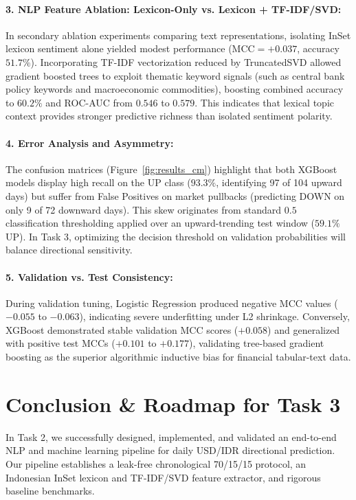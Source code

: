 \documentclass[10pt,a4paper]{article}
\begin{document}
\paragraph{3. NLP Feature Ablation: Lexicon-Only vs. Lexicon + TF-IDF/SVD:}
In secondary ablation experiments comparing text representations, isolating InSet lexicon sentiment alone yielded modest performance ($\text{MCC} = +0.037$, accuracy $51.7\%$). Incorporating TF-IDF vectorization reduced by TruncatedSVD allowed gradient boosted trees to exploit thematic keyword signals (such as central bank policy keywords and macroeconomic commodities), boosting combined accuracy to $60.2\%$ and ROC-AUC from $0.546$ to $0.579$. This indicates that lexical topic context provides stronger predictive richness than isolated sentiment polarity.

\paragraph{4. Error Analysis and Asymmetry:}
The confusion matrices (Figure~\ref{fig:results_cm}) highlight that both XGBoost models display high recall on the UP class ($93.3\%$, identifying 97 of 104 upward days) but suffer from False Positives on market pullbacks (predicting DOWN on only 9 of 72 downward days). This skew originates from standard $0.5$ classification thresholding applied over an upward-trending test window ($59.1\%$ UP). In Task 3, optimizing the decision threshold on validation probabilities will balance directional sensitivity.

\paragraph{5. Validation vs. Test Consistency:}
During validation tuning, Logistic Regression produced negative MCC values ($-0.055$ to $-0.063$), indicating severe underfitting under L2 shrinkage. Conversely, XGBoost demonstrated stable validation MCC scores ($+0.058$) and generalized with positive test MCCs ($+0.101$ to $+0.177$), validating tree-based gradient boosting as the superior algorithmic inductive bias for financial tabular-text data.

\vspace{-0.3em}
\section{Conclusion \& Roadmap for Task 3}
In Task 2, we successfully designed, implemented, and validated an end-to-end NLP and machine learning pipeline for daily USD/IDR directional prediction. Our pipeline establishes a leak-free chronological 70/15/15 protocol, an Indonesian InSet lexicon and TF-IDF/SVD feature extractor, and rigorous baseline benchmarks.
\end{document}
